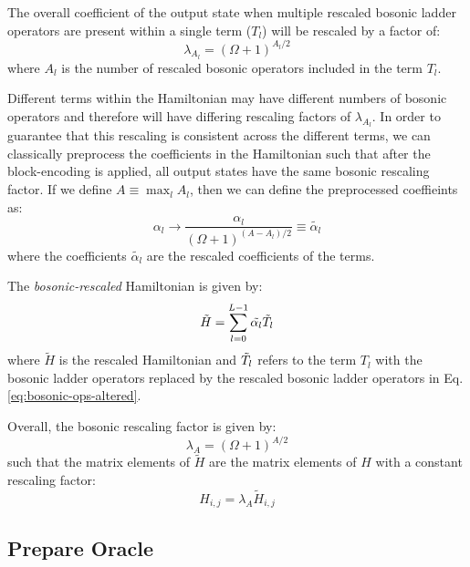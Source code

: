 The overall coefficient of the output state when multiple rescaled bosonic ladder operators are present within a single term ($T_l$) will be rescaled by a factor of:
\begin{equation}
    \lambda_{A_l} = (\Omega + 1)^{A_l/2}
\end{equation}
where $A_l$ is the number of rescaled bosonic operators included in the term $T_l$.

Different terms within the Hamiltonian may have different numbers of bosonic operators and therefore will have differing rescaling factors of $\lambda_{A_l}$.
In order to guarantee that this rescaling is consistent across the different terms, we can classically preprocess the coefficients in the Hamiltonian such that after the block-encoding is applied, all output states have the same bosonic rescaling factor.
If we define $A \equiv \max_l{A_l}$, then we can define the preprocessed coeffieints as:
\begin{equation}
    \label{eq:bosonic-coeff-rescaling}
    \alpha_l \rightarrow \frac{\alpha_l}{(\Omega + 1)^{(A - A_l)/2}} \equiv \tilde{\alpha_l}
\end{equation}
where the coefficients $\tilde{\alpha_l}$ are the rescaled coefficients of the terms.

The \textit{bosonic-rescaled} Hamiltonian is given by:
\begin{equation}
    \tilde{H} = \sum_{l=0}^{L-1} \tilde{\alpha_l} \Tilde{T}_l
\end{equation}
where $\tilde{H}$ is the rescaled Hamiltonian and $\Tilde{T}_l$ refers to the term $T_l$ with the bosonic ladder operators replaced by the rescaled bosonic ladder operators in Eq. \ref{eq:bosonic-ops-altered}.

Overall, the bosonic rescaling factor is given by:
\begin{equation}
    \label{eq:bosonic-rescaling-factor}
    \lambda_A = (\Omega + 1)^{A/2}
\end{equation}
such that the matrix elements of $\tilde{H}$ are the matrix elements of $H$ with a constant rescaling factor:
\begin{equation}
    H_{i,j} = \lambda_A \tilde{H}_{i,j}
\end{equation}

\subsection{Prepare Oracle}
\label{subsec:prepare}

